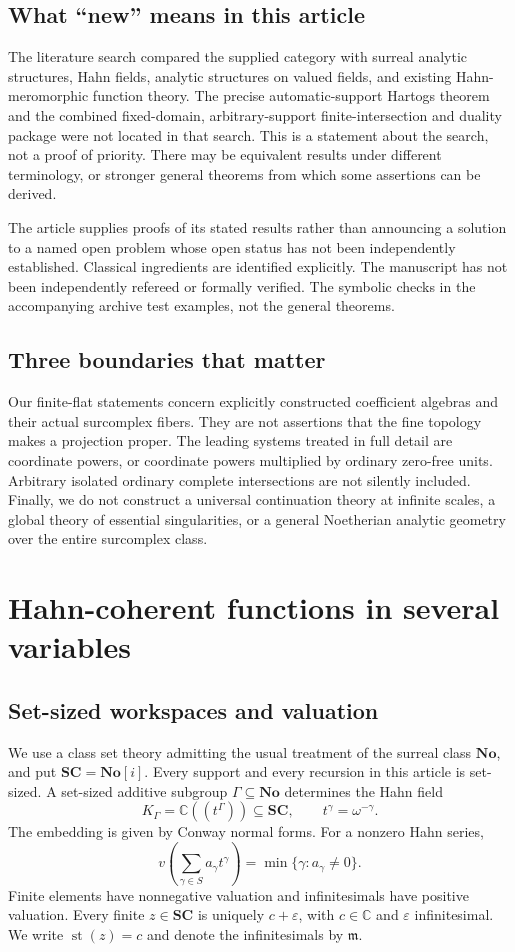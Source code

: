 \documentclass[11pt,oneside]{article}
\numberwithin{equation}{section}
\theoremstyle{definition}
\theoremstyle{remark}\newtheorem{remark}[theorem]{Remark}
\newcommand{\C}{\mathbb C}
\newcommand{\No}{\mathbf{No}}
\newcommand{\SC}{\mathbf{SC}}
\newcommand{\mm}{\mathfrak m}
\newcommand{\st}{\operatorname{st}}
\begin{document}
\subsection{What ``new'' means in this article}
The literature search compared the supplied category with surreal analytic structures, Hahn fields, analytic structures on valued fields, and existing Hahn-meromorphic function theory. The precise automatic-support Hartogs theorem and the combined fixed-domain, arbitrary-support finite-intersection and duality package were not located in that search. This is a statement about the search, not a proof of priority. There may be equivalent results under different terminology, or stronger general theorems from which some assertions can be derived.

The article supplies proofs of its stated results rather than announcing a solution to a named open problem whose open status has not been independently established. Classical ingredients are identified explicitly. The manuscript has not been independently refereed or formally verified. The symbolic checks in the accompanying archive test examples, not the general theorems.

\subsection{Three boundaries that matter}
Our finite-flat statements concern explicitly constructed coefficient algebras and their actual surcomplex fibers. They are not assertions that the fine topology makes a projection proper. The leading systems treated in full detail are coordinate powers, or coordinate powers multiplied by ordinary zero-free units. Arbitrary isolated ordinary complete intersections are not silently included. Finally, we do not construct a universal continuation theory at infinite scales, a global theory of essential singularities, or a general Noetherian analytic geometry over the entire surcomplex class.

\section{Hahn-coherent functions in several variables}\label{sec:foundations}
\subsection{Set-sized workspaces and valuation}
We use a class set theory admitting the usual treatment of the surreal class \(\No\), and put \(\SC=\No[i]\). Every support and every recursion in this article is set-sized. A set-sized additive subgroup \(\Gamma\subseteq\No\) determines the Hahn field
\[
 K_\Gamma=\C((t^\Gamma))\subseteq\SC,
 \qquad t^\gamma=\omega^{-\gamma}.
\]
The embedding is given by Conway normal forms. For a nonzero Hahn series,
\[
 v\left(\sum_{\gamma\in S}a_\gamma t^\gamma\right)
 =\min\{\gamma:a_\gamma\ne0\}.
\]
Finite elements have nonnegative valuation and infinitesimals have positive valuation. Every finite \(z\in\SC\) is uniquely \(c+\varepsilon\), with \(c\in\C\) and \(\varepsilon\) infinitesimal. We write \(\st(z)=c\) and denote the infinitesimals by \(\mm\).
\end{document}
